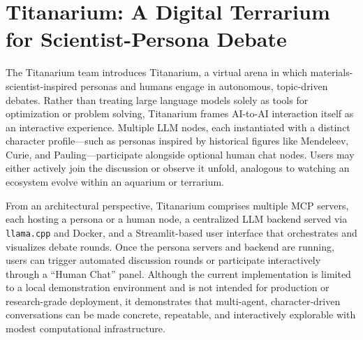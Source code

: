 

\section{Titanarium: A Digital Terrarium for Scientist-Persona Debate}

%

The Titanarium team introduces Titanarium, a virtual arena in which materials-scientist-inspired personas and humans engage in autonomous, topic-driven debates. Rather than treating large language models solely as tools for optimization or problem solving, Titanarium frames AI-to-AI interaction itself as an interactive experience. Multiple LLM nodes, each instantiated with a distinct character profile—such as personas inspired by historical figures like Mendeleev, Curie, and Pauling—participate alongside optional human chat nodes. Users may either actively join the discussion or observe it unfold, analogous to watching an ecosystem evolve within an aquarium or terrarium.

From an architectural perspective, Titanarium comprises multiple MCP servers, each hosting a persona or a human node, a centralized LLM backend served via \texttt{llama.cpp} and Docker, and a Streamlit-based user interface that orchestrates and visualizes debate rounds. Once the persona servers and backend are running, users can trigger automated discussion rounds or participate interactively through a ``Human Chat'' panel. Although the current implementation is limited to a local demonstration environment and is not intended for production or research-grade deployment, it demonstrates that multi-agent, character-driven conversations can be made concrete, repeatable, and interactively explorable with modest computational infrastructure.


